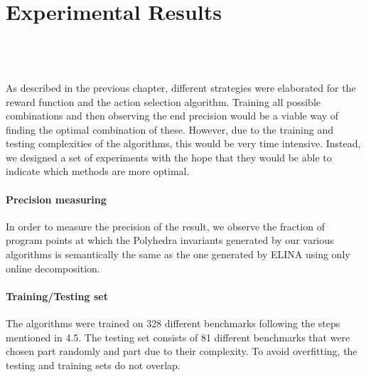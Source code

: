 
\chapter{Experimental Results}
\mbox{}\\
\mbox{}\\
\mbox{}\\
As described in the previous chapter, different strategies were elaborated for the reward function and the action selection algorithm. Training all possible combinations and then observing the end precision would be a viable way of finding the optimal combination of these. However, due to the training and testing complexities of the algorithms, this would be very time intensive. Instead, we designed a set of experiments with the hope that they would be able to indicate which methods are more optimal.
\subsubsection{Precision measuring}
In order to measure the precision of the result, we observe the fraction of program points at which the Polyhedra invariants generated by our various algorithms is semantically the same as the one generated by ELINA using only online decomposition.
\subsubsection{Training/Testing set}
The algorithms were trained on 328 different benchmarks following the steps mentioned in 4.5. The testing set consists of 81 different benchmarks that were chosen part randomly and part due to their complexity. To avoid overfitting, the testing and training sets do not overlap.


